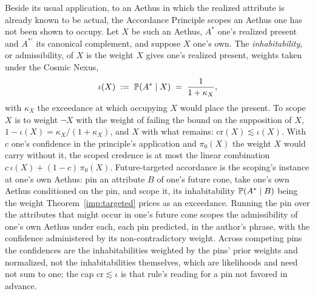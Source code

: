 \begin{definition}\label{imp:scoping}
Beside its usual application, to an Aethus in which the realized
attribute is already known to be actual, the Accordance Principle scopes
an Aethus one has not been shown to occupy. Let $X$ be such an Aethus,
$A^\ast$ one's realized present and $A^{\ast\prime}$ its canonical
complement, and suppose $X$ one's own. The \emph{inhabitability}, or
admissibility, of $X$ is the weight $X$ gives one's realized present,
weights taken under the Cosmic Nexus,
\begin{equation}\label{imp:eq:scoping}
\iota(X)\;:=\;\mathbb{P}(A^\ast\mid X)\;=\;\frac{1}{1+\kappa_X},
\end{equation}
with $\kappa_X$ the exceedance at which occupying $X$ would place the
present. To scope $X$ is to weight $\neg X$ with the weight of failing
the bound on the supposition of $X$, $1-\iota(X)=\kappa_X/(1+\kappa_X)$,
and $X$ with what remains: $\mathrm{cr}(X)\lesssim\iota(X)$. With $c$
one's confidence in the principle's application and $\pi_0(X)$ the
weight $X$ would carry without it, the scoped credence is at most the
linear combination $c\,\iota(X)+(1-c)\,\pi_0(X)$. Future-targeted
accordance is the scoping's instance at one's own Aethus: pin an
attribute $B$ of one's future cone, take one's own Aethus conditioned on
the pin, and scope it, its inhabitability $\mathbb{P}(A^\ast\mid B)$ being the
weight Theorem~\ref{imp:targeted} prices as an exceedance. Running the
pin over the attributes that might occur in one's future cone scopes the
admissibility of one's own Aethus under each, each pin predicted, in the
author's phrase, with the confidence administered by its
non-contradictory weight. Across competing pins the confidences are the
inhabitabilities weighted by the pins' prior weights and normalized, not
the inhabitabilities themselves, which are likelihoods and need not sum
to one; the cap $\mathrm{cr}\lesssim\iota$ is that rule's reading for a
pin not favored in advance.
\end{definition}

